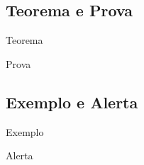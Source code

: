 \documentclass[aspectratio = 169]{beamer}
\begin{document}
\subsection{Teorema e Prova}

\begin{frame}{Teorema}
    
\end{frame}

\begin{frame}{Prova}
    
\end{frame}

\subsection{Exemplo e Alerta}

\begin{frame}{Exemplo}
    
\end{frame}

\begin{frame}{Alerta}
    
\end{frame}
\end{document}
